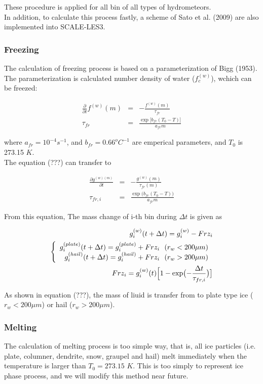 These procedure is applied for all bin of all types of hydrometeors.\\
In addition, to calculate this process fastly, a scheme of Sato et al. (2009) are also implemented into SCALE-LES3.

\subsubsection{Freezing}
The calculation of freezing process is based on a parameterization of Bigg (1953). The parameterization is calculated number density of water ($f_{c}^{(w)}$), wchich can be freezed:

\begin{eqnarray}
\frac{\partial}{\partial t}f^{(w)}(m)&=&-\frac{f^{(w)}(m)}{\tau_{fr}}\\
\tau_{fr}&=&\frac{\exp \bigl[b_{fr}(T_{0}-T)\bigr]}{a_{fr} m}\nonumber 
\end{eqnarray}

where $a_{fr}=10^{-4}s^{-1}$, and $b_{fr}=0.66^{o}C^{-1}$ are emperical parameters, and $T_{0}$ is 273.15 $K$.\\
The equation (???) can transfer to

\begin{eqnarray}
\frac{\partial g^{(w)(m)}}{\partial t}&=&-\frac{g^{(w)}(m)}{\tau_{fr}(m)}\\
\tau_{fr,i}&=&\frac{\exp\bigl (b_{fr}(T_{0}-T)\bigr )}{a_{fr}m}\nonumber
\end{eqnarray} 

From this equation, The mass change of i-th bin during $\Delta t$ is given as

\begin{eqnarray}
g_{i}^{(w)}(t+\Delta t)=g_{i}^{(w)}-Frz_{i}\\
\left \{
\begin{array}{r}
g_{i}^{(plate)}(t+\Delta t)=g_{i}^{(plate)}+Frz_{i}\:\:\: (r_{w}<200\mu m)\\
g_{i}^{(hail)}(t+\Delta t)=g_{i}^{(hail)}+Frz_{i}\:\:\: (r_{w}>200\mu m)
\end{array} \right.\\
Frz_{i}=g_{i}^{(w)}(t)\Bigl [1-\exp\bigl (-\frac{\Delta t}{\tau_{fr,i}}\bigr )\bigr]\nonumber
\end{eqnarray}


 As shown in equation (???), the mass of liuid is transfer from to plate type ice ($r_{w}<200\mu m$) or hail ($r_{w}>200\mu m$).

\subsubsection{Melting}
The calculation of melting process is too simple way, that is, all ice particles (i.e. plate, columner, dendrite, snow, graupel and hail) melt immediately when the temperature is larger than $T_{0}=273.15$ $K$. This is too simply to represent ice phase process, and we will modify this method near future.
 
